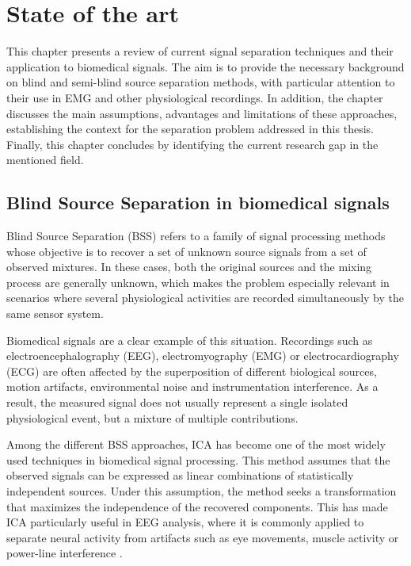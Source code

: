 \chapter{State of the art}

This chapter presents a review of current signal separation techniques and their application to biomedical signals. The aim is to provide the necessary background on blind and semi-blind source separation methods, with particular attention to their use in EMG and other physiological recordings. In addition, the chapter discusses the main assumptions, advantages and limitations of these approaches, establishing the context for the separation problem addressed in this thesis. Finally, this chapter concludes by identifying the current research gap in the mentioned field.

\section{Blind Source Separation in biomedical signals}

Blind Source Separation (BSS) refers to a family of signal processing methods whose objective is to recover a set of unknown source signals from a set of observed mixtures. In these cases, both the original sources and the mixing process are generally unknown, which makes the problem especially relevant in scenarios where several physiological activities are recorded simultaneously by the same sensor system.

Biomedical signals are a clear example of this situation. Recordings such as electroencephalography (EEG), electromyography (EMG) or electrocardiography (ECG) are often affected by the superposition of different biological sources, motion artifacts, environmental noise and instrumentation interference. As a result, the measured signal does not usually represent a single isolated physiological event, but a mixture of multiple contributions.

Among the different BSS approaches, ICA has become one of the most widely used techniques in biomedical signal processing. This method assumes that the observed signals can be expressed as linear combinations of statistically independent sources. Under this assumption, the method seeks a transformation that maximizes the independence of the recovered components. This has made ICA particularly useful in EEG analysis, where it is commonly applied to separate neural activity from artifacts such as eye movements, muscle activity or power-line interference \cite{klug_identifying_2021,kanna_advanced_2019}.

